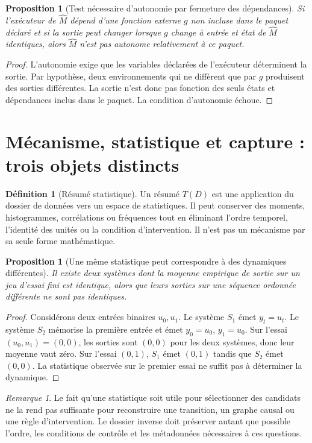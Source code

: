 \documentclass[11pt,oneside]{book}
\newtheorem{proposition}[theoreme]{Proposition}
\theoremstyle{definition}
\newtheorem{definition}[theoreme]{Définition}
\theoremstyle{remark}
\newtheorem{remarque}[theoreme]{Remarque}
\newcommand{\1}{\mathbf 1}
\begin{document}
\begin{proposition}[Test nécessaire d'autonomie par fermeture des dépendances]
Si l'exécuteur de $\widehat M$ dépend d'une fonction externe $g$ non incluse dans le paquet déclaré et si la sortie peut changer lorsque $g$ change à entrée et état de $\widehat M$ identiques, alors $\widehat M$ n'est pas autonome relativement à ce paquet.
\end{proposition}
\begin{proof}
L'autonomie exige que les variables déclarées de l'exécuteur déterminent la sortie. Par hypothèse, deux environnements qui ne diffèrent que par $g$ produisent des sorties différentes. La sortie n'est donc pas fonction des seuls états et dépendances inclus dans le paquet. La condition d'autonomie échoue.\end{proof}

\section{Mécanisme, statistique et capture : trois objets distincts}
\begin{definition}[Résumé statistique]
Un résumé $T(D)$ est une application du dossier de données vers un espace de statistiques. Il peut conserver des moments, histogrammes, corrélations ou fréquences tout en éliminant l'ordre temporel, l'identité des unités ou la condition d'intervention. Il n'est pas un mécanisme par sa seule forme mathématique.
\end{definition}

\begin{proposition}[Une même statistique peut correspondre à des dynamiques différentes]
Il existe deux systèmes dont la moyenne empirique de sortie sur un jeu d'essai fini est identique, alors que leurs sorties sur une séquence ordonnée différente ne sont pas identiques.
\end{proposition}
\begin{proof}
Considérons deux entrées binaires $u_0,u_1$. Le système $S_1$ émet $y_t=u_t$. Le système $S_2$ mémorise la première entrée et émet $y_0=u_0$, $y_1=u_0$. Sur l'essai $(u_0,u_1)=(0,0)$, les sorties sont $(0,0)$ pour les deux systèmes, donc leur moyenne vaut zéro. Sur l'essai $(0,1)$, $S_1$ émet $(0,1)$ tandis que $S_2$ émet $(0,0)$. La statistique observée sur le premier essai ne suffit pas à déterminer la dynamique.\end{proof}

\begin{remarque}
Le fait qu'une statistique soit utile pour sélectionner des candidats ne la rend pas suffisante pour reconstruire une transition, un graphe causal ou une règle d'intervention. Le dossier inverse doit préserver autant que possible l'ordre, les conditions de contrôle et les métadonnées nécessaires à ces questions.
\end{remarque}
\end{document}
